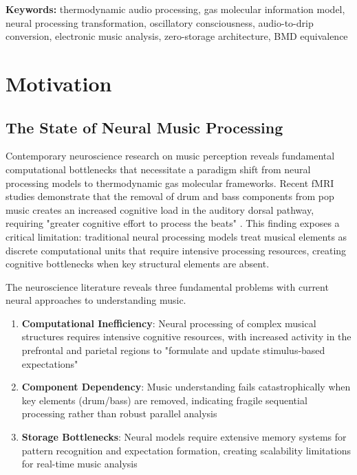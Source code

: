 \documentclass[12pt,a4paper]{article}
\begin{document}
\textbf{Keywords:} thermodynamic audio processing, gas molecular information model, neural processing transformation, oscillatory consciousness, audio-to-drip conversion, electronic music analysis, zero-storage architecture, BMD equivalence


\tableofcontents

\section{Motivation}

\subsection{The State of Neural Music Processing}

Contemporary neuroscience research on music perception reveals fundamental computational bottlenecks that necessitate a paradigm shift from neural processing models to thermodynamic gas molecular frameworks. Recent fMRI studies demonstrate that the removal of drum and bass components from pop music creates an increased cognitive load in the auditory dorsal pathway, requiring "greater cognitive effort to process the beats" \cite{zalta2024neural}. This finding exposes a critical limitation: traditional neural processing models treat musical elements as discrete computational units that require intensive processing resources, creating cognitive bottlenecks when key structural elements are absent.

The neuroscience literature reveals three fundamental problems with current neural approaches to understanding music.

\begin{enumerate}
\item \textbf{Computational Inefficiency}: Neural processing of complex musical structures requires intensive cognitive resources, with increased activity in the prefrontal and parietal regions to "formulate and update stimulus-based expectations" \cite{matthews2020groove}
\item \textbf{Component Dependency}: Music understanding fails catastrophically when key elements (drum/bass) are removed, indicating fragile sequential processing rather than robust parallel analysis
\item \textbf{Storage Bottlenecks}: Neural models require extensive memory systems for pattern recognition and expectation formation, creating scalability limitations for real-time music analysis
\end{enumerate}
\end{document}
